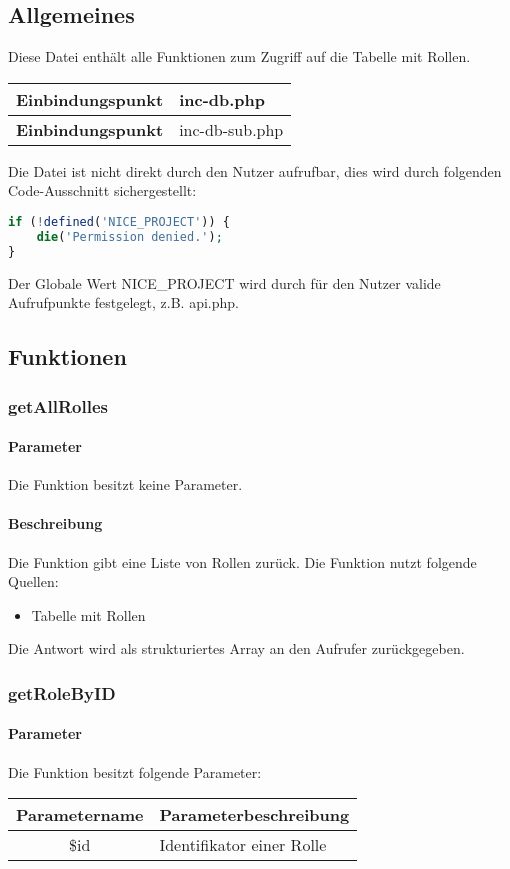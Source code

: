 \subsection{Allgemeines} Diese Datei enthält alle Funktionen zum Zugriff auf die Tabelle mit Rollen.
\begin{table}[H]
	\begin{tabular}{|c|p{11cm}|}
		\hline
		\textbf{Einbindungspunkt} & inc-db.php \\ \hline
		\textbf{Einbindungspunkt} & inc-db-sub.php \\ \hline
	\end{tabular}
\end{table}
Die Datei ist nicht direkt durch den Nutzer aufrufbar, dies wird durch folgenden Code-Ausschnitt sichergestellt:
\begin{lstlisting}[language=php]
if (!defined('NICE_PROJECT')) {
	die('Permission denied.');
}
\end{lstlisting}
Der Globale Wert {\glqq NICE\_PROJECT\grqq} wird durch für den Nutzer valide Aufrufpunkte festgelegt, z.B. {\glqq api.php\grqq}.
\newpage
\subsection{Funktionen}
\subsubsection{getAllRolles}
\paragraph{Parameter} Die Funktion besitzt keine Parameter.
\paragraph{Beschreibung} Die Funktion gibt eine Liste von Rollen zurück. Die Funktion nutzt folgende Quellen:
\begin{itemize}
	\item Tabelle mit Rollen
\end{itemize}
Die Antwort wird als strukturiertes Array an den Aufrufer zurückgegeben.
\subsubsection{getRoleByID}
\paragraph{Parameter} Die Funktion besitzt folgende Parameter:
\begin{table}[H]
	\begin{tabular}{|c|p{11cm}|}
		\hline
		\textbf{Parametername} & \textbf{Parameterbeschreibung} \\ \hline
		\$id & Identifikator einer Rolle \\ \hline
	\end{tabular}
\end{table}
